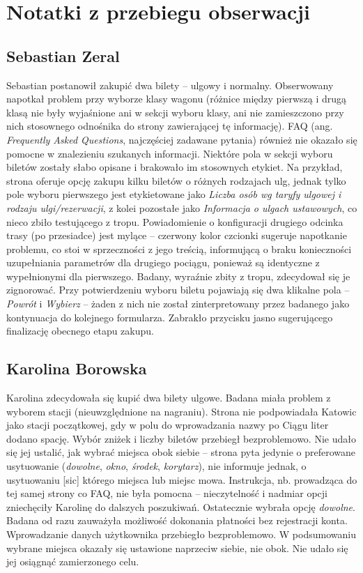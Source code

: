 \documentclass{article}
\begin{document}
\section{Notatki z przebiegu obserwacji}
\subsection{Sebastian Zeral}
Sebastian postanowił zakupić dwa bilety -- ulgowy i normalny.
Obserwowany napotkał problem przy wyborze klasy wagonu (różnice między pierwszą i drugą klasą nie były wyjaśnione ani w sekcji wyboru klasy,
ani nie zamieszczono przy nich stosownego odnośnika do strony zawierającej tę informację).
FAQ (ang. \emph{Frequently Asked Questions}, najczęściej zadawane pytania) również nie okazało się pomocne w znalezieniu szukanych informacji.
Niektóre pola w sekcji wyboru biletów zostały słabo opisane i brakowało im stosownych etykiet. Na przykład, strona oferuje opcję zakupu
kilku biletów o różnych rodzajach ulg, jednak tylko pole wyboru pierwszego jest etykietowane jako \emph{Liczba osób wg taryfy ulgowej
i rodzaju ulgi/rezerwacji}, z kolei pozostałe jako \emph{Informacja o ulgach ustawowych}, co nieco zbiło testującego z tropu.
Powiadomienie o konfiguracji drugiego odcinka trasy (po przesiadce) jest mylące -- czerwony kolor czcionki sugeruje
napotkanie problemu, co stoi w sprzeczności z jego treścią, informującą o braku konieczności
uzupełniania parametrów dla drugiego pociągu, ponieważ są identyczne z wypełnionymi dla pierwszego. Badany, wyraźnie zbity z tropu, zdecydował się je zignorować.
Przy potwierdzeniu wyboru biletu pojawiają się dwa klikalne pola -- \emph{Powrót} i \emph{Wybierz} -- żaden z nich nie został zinterpretowany przez badanego
jako kontynuacja do kolejnego formularza. Zabrakło przycisku jasno sugerującego finalizację obecnego etapu zakupu.

\subsection{Karolina Borowska}
\label{3.2.}
Karolina zdecydowała się kupić dwa bilety ulgowe. Badana miała problem z wyborem stacji (nieuwzględnione na nagraniu).
Strona nie podpowiadała Katowic jako stacji początkowej, gdy w polu do wprowadzania nazwy po Ciągu liter dodano spację.
Wybór zniżek i liczby biletów przebiegł bezproblemowo. Nie udało się jej ustalić, jak wybrać miejsca obok siebie -- strona pyta jedynie o preferowane
usytuowanie (\emph{dowolne}, \emph{okno}, \emph{środek}, \emph{korytarz}), nie informuje jednak, o usytuowaniu [sic] którego miejsca lub miejsc mowa.
Instrukcja, nb. prowadząca do tej samej strony co FAQ, nie była pomocna -- nieczytelność i nadmiar opcji zniechęciły Karolinę do dalszych poszukiwań.
Ostatecznie wybrała opcję \emph{dowolne}. Badana od razu zauważyła możliwość dokonania płatności bez rejestracji konta.
Wprowadzanie danych użytkownika przebiegło bezproblemowo. W podsumowaniu wybrane miejsca okazały się ustawione
naprzeciw siebie, nie obok. Nie udało się jej osiągnąć zamierzonego celu.
\end{document}
